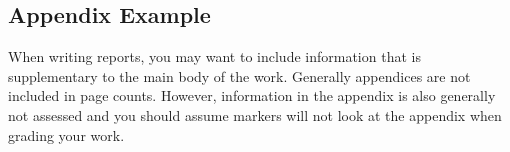 \begin{appendices}
\section{Appendix Example}
When writing reports, you may want to include information that is supplementary to the main body of the work. Generally appendices are not included in page counts. However, information in the appendix is also generally not assessed and you should assume markers will not look at the appendix when grading your work.
% 
\end{appendices}
% 
